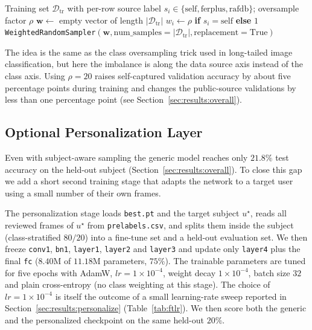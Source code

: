 \begin{algorithm}[H]
\small
\caption{Subject-aware weighted random sampler}
\label{alg:sampler}
\begin{algorithmic}[1]
\Require Training set $\mathcal{D}_{\text{tr}}$ with per-row source
         label $s_i \in \{\text{self},\text{ferplus},\text{rafdb}\}$;
         oversample factor $\rho$
  \State $\mathbf{w} \gets$ empty vector of length $|\mathcal{D}_{\text{tr}}|$
    \State $w_i \gets \rho$ \textbf{if} $s_i = \text{self}$ \textbf{else} $1$
  \EndFor
  \State \Return \texttt{WeightedRandomSampler}$(\mathbf{w},
         \text{num\_samples}=|\mathcal{D}_{\text{tr}}|,
         \text{replacement}=\text{True})$
\EndFunction
\end{algorithmic}
\end{algorithm}

The idea is the same as the class oversampling trick used in long-tailed image classification, but here the imbalance is along the data source axis instead of the class axis. Using $\rho=20$ raises self-captured validation accuracy by about five percentage points during training and changes the public-source validations by less than one percentage point (see Section~\ref{sec:results:overall}).

\subsection{Optional Personalization Layer}
\label{sec:impl:personalize}

Even with subject-aware sampling the generic model reaches only $21.8\%$ test accuracy on the held-out subject (Section~\ref{sec:results:overall}). To close this gap we add a short second training stage that adapts the network to a target user using a small number of their own frames.

The personalization stage loads \texttt{best.pt} and the target subject $u^\star$, reads all reviewed frames of $u^\star$ from \texttt{prelabels.csv}, and splits them inside the subject (class-stratified $80/20$) into a fine-tune set and a held-out evaluation set. We then freeze \texttt{conv1}, \texttt{bn1}, \texttt{layer1}, \texttt{layer2} and \texttt{layer3} and update only \texttt{layer4} plus the final \texttt{fc} ($8.40$M of $11.18$M parameters, $75\%$). The trainable parameters are tuned for five epochs with AdamW, $lr=1\times 10^{-4}$, weight decay $1\times 10^{-4}$, batch size $32$ and plain cross-entropy (no class weighting at this stage). The choice of $lr=1\times 10^{-4}$ is itself the outcome of a small learning-rate sweep reported in Section~\ref{sec:results:personalize} (Table~\ref{tab:ftlr}). We then score both the generic and the personalized checkpoint on the same held-out $20\%$.

